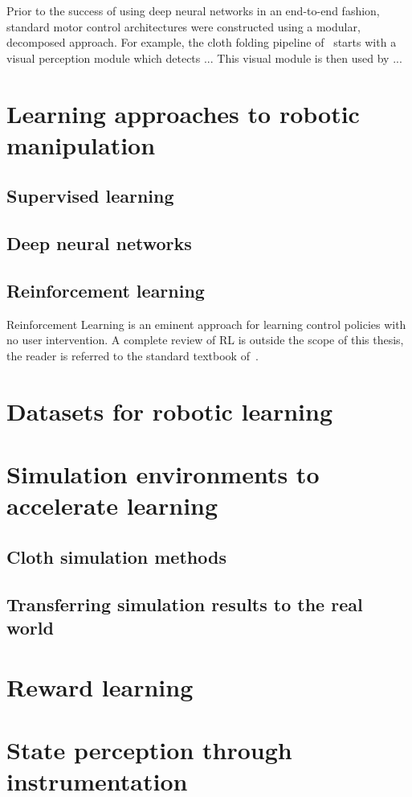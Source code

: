 \documentclass[\home/main.tex]{subfiles}
\begin{document}
Prior to the success of using deep neural networks in an end-to-end fashion, standard motor control architectures were constructed using a modular, decomposed approach. For example, the cloth folding pipeline of~\citeauthor{Doumanoglou2016} starts with a visual perception module which detects ... This visual module is then used by ...

\section{Learning approaches to robotic manipulation} \label{sec:lit_learning}

\subsection{Supervised learning} \label{subsec:lit_sl}
\subsection{Deep neural networks} \label{subsec:lit_dnn}
\subsection{Reinforcement learning} \label{subsec:lit_rl}

Reinforcement Learning is an eminent approach for learning control policies with no user intervention. A complete review of RL is outside the scope of this thesis, the reader is referred to the standard textbook of~\citeauthor{SuttonAndBarto}. 

\section{Datasets for robotic learning} \label{sec:lit_datasets}
\section{Simulation environments to accelerate learning} \label{sec:lit_simulation}
\subsection{Cloth simulation methods} \label{subsec:lit_cloth_sim}
\subsection{Transferring simulation results to the real world}  \label{sec:lit_sim2real}
\section{Reward learning}  \label{sec:lit_reward_learning}
\section{State perception through instrumentation} \label{sec:lit_instrumentation}
\end{document}
